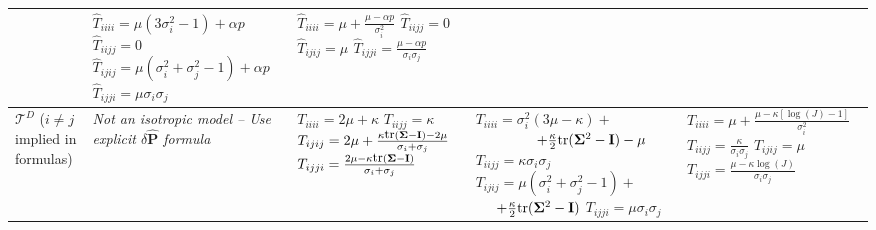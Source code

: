 \begin{landscape}
\begin{table}[h]
\begin{tabular}{|C{1in}|C{1.75in}|C{1.75in}|C{1.75in}|C{1.75in}|}
			& \newline $\hat{T}_{iiii}=\mu(3\sigma_i^2-1)+\alpha p$ \newline $\hat{T}_{iijj}=0$ \newline $\hat{T}_{ijij}=\mu(\sigma_i^2+\sigma_j^2-1)+\alpha p$ \newline  $\hat{T}_{ijji}=\mu\sigma_i\sigma_j$ \newline
				& \newline $\hat{T}_{iiii}=\mu+\frac{\mu-\alpha p}{\sigma_i^2}$ \newline $\hat{T}_{iijj}=0$ \newline $\hat{T}_{ijij}=\mu$ \newline  $\hat{T}_{ijji}=\frac{\mu-\alpha p}{\sigma_i\sigma_j}$ \newline \\
\hline
$\mathcal{T}^D$ \newline ($i\ne j$ implied \newline in  formulas)
	& \emph{Not an isotropic model -- Use explicit $\delta\mathbf{\hat{P}}$ formula}
		&  \newline $T_{iiii}=2\mu+\kappa$ \newline $T_{iijj}=\kappa$ \newline $T_{ijij}=2\mu+\frac{\kappa\mbox{\small tr}(\mathbf{\Sigma}-\mathbf{I})-2\mu}{\sigma_i+\sigma_j}$ \newline  $T_{ijji}=\frac{2\mu-\kappa\mbox{\small tr}(\mathbf{\Sigma}-\mathbf{I})}{\sigma_i+\sigma_j}$ \newline
			& \newline $T_{iiii}=\sigma_i^2(3\mu-\kappa)+$\newline$\hspace*{.6in}+\frac{\kappa}{2}\mbox{tr}(\mathbf{\Sigma}^2-\mathbf{I})-\mu$ \newline $T_{iijj}=\kappa\sigma_i\sigma_j$ \newline $T_{ijij}=\mu(\sigma_i^2+\sigma_j^2-1)+$\newline$\hspace*{.2in}+\frac{\kappa}{2}\mbox{tr}(\mathbf{\Sigma}^2-\mathbf{I})$ \newline  $T_{ijji}=\mu\sigma_i\sigma_j$ \newline
				& \newline $T_{iiii}=\mu+\frac{\mu-\kappa[\log(J)-1]}{\sigma_i^2}$ \newline $T_{iijj}=\frac{\kappa}{\sigma_i\sigma_j}$ \newline $T_{ijij}=\mu$ \newline  $T_{ijji}=\frac{\mu-\kappa\log(J)}{\sigma_i\sigma_j}$ \newline \\
\hline\end{tabular}
\label{tab:mat2}
\end{table}

\end{landscape}

